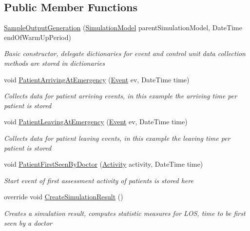 \subsection*{Public Member Functions}
\begin{DoxyCompactItemize}
\item 
\hyperlink{class_sample_hospital_model_1_1_output_1_1_sample_output_generation_ab29a43c5cc969a4781fcf6bf7d9e8e57}{Sample\+Output\+Generation} (\hyperlink{class_simulation_core_1_1_simulation_classes_1_1_simulation_model}{Simulation\+Model} parent\+Simulation\+Model, Date\+Time end\+Of\+Warm\+Up\+Period)
\begin{DoxyCompactList}\small\item\em Basic constructor, delegate dictionaries for event and control unit data collection methods are stored in dictionaries \end{DoxyCompactList}\item 
void \hyperlink{class_sample_hospital_model_1_1_output_1_1_sample_output_generation_a1c3260dc090617381ef9886e3bcfcc53}{Patient\+Arriving\+At\+Emergency} (\hyperlink{class_simulation_core_1_1_h_c_c_m_elements_1_1_event}{Event} ev, Date\+Time time)
\begin{DoxyCompactList}\small\item\em Collects data for patient arriving events, in this example the arriving time per patient is stored \end{DoxyCompactList}\item 
void \hyperlink{class_sample_hospital_model_1_1_output_1_1_sample_output_generation_a109f9dd2e7f50c7ce8fd0e594fc46ecf}{Patient\+Leaving\+At\+Emergency} (\hyperlink{class_simulation_core_1_1_h_c_c_m_elements_1_1_event}{Event} ev, Date\+Time time)
\begin{DoxyCompactList}\small\item\em Collects data for patient leaving events, in this example the leaving time per patient is stored \end{DoxyCompactList}\item 
void \hyperlink{class_sample_hospital_model_1_1_output_1_1_sample_output_generation_a656c338c77b0d9958e39ead49a2c145d}{Patient\+First\+Seen\+By\+Doctor} (\hyperlink{class_simulation_core_1_1_h_c_c_m_elements_1_1_activity}{Activity} activity, Date\+Time time)
\begin{DoxyCompactList}\small\item\em Start event of first assessment activity of patients is stored here \end{DoxyCompactList}\item 
override void \hyperlink{class_sample_hospital_model_1_1_output_1_1_sample_output_generation_abf426fe678c73aceefa1493178be678f}{Create\+Simulation\+Result} ()
\begin{DoxyCompactList}\small\item\em Creates a simulation result, computes statistic measures for L\+OS, time to be first seen by a doctor \end{DoxyCompactList}\end{DoxyCompactItemize}
